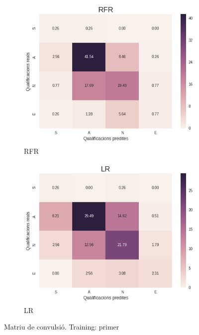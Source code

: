 \documentclass[12pt,a4paper,catalan]{article}
\begin{document}
\begin{figure}[h]
\centering
\begin{subfigure}{.48\textwidth}
  \centering
  \includegraphics[width=\linewidth]{img/heatmap_rfr_primer_segon.png}
  \caption{RFR}
\end{subfigure}
\begin{subfigure}{.48\textwidth}
  \centering
  \includegraphics[width=\linewidth]{img/heatmap_lr_primer_segon.png}
  \caption{LR}
\end{subfigure}
\caption{Matriu de convulsió. Training: primer}
\end{figure}
\end{document}
